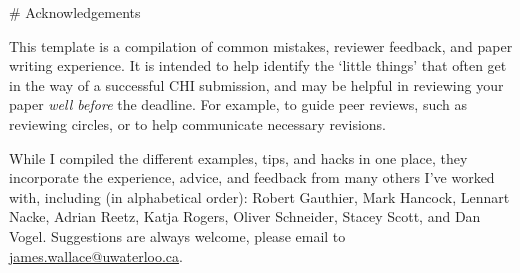


\begin{markdown}

# Acknowledgements

This template is a compilation of common mistakes, reviewer feedback, and paper writing experience. It is intended to help identify the `little things' that often get in the way of a successful CHI submission, and may be helpful in reviewing your paper \textit{well before} the deadline. For example, to guide peer reviews, such as reviewing circles, or to help communicate necessary revisions. 

While I compiled the different examples, tips, and hacks in one place, they incorporate the experience, advice, and feedback from many others I've worked with, including (in alphabetical order): Robert Gauthier, Mark Hancock, Lennart Nacke, Adrian Reetz, Katja Rogers, Oliver Schneider, Stacey Scott, and Dan Vogel. Suggestions are always welcome, please email to \href{mailto:james.wallace@uwaterloo.ca}{james.wallace@uwaterloo.ca}. 

\end{markdown}